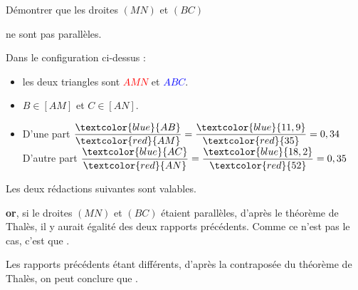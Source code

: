 \begin{methode*1}
\begin{minipage}{8cm}
                Démontrer que les droites $(MN)$ et $(BC)$ 
                
                ne sont pas parallèles.
            \end{minipage}
            
            \correction
            Dans le configuration ci-dessus : 
            \begin{itemize}
                \item les deux triangles sont \textcolor{red}{$AMN$} et \textcolor{blue}{$ABC$}.
                \item $B \in [AM]$ et $C \in [AN]$.
                \item D'une part $\dfrac{\textcolor{blue}{AB}}{\textcolor{red}{AM}} = \dfrac{\textcolor{blue}{11,9}}{\textcolor{red}{35}}=0,34$
                \hfill
                D'autre part $\dfrac{\textcolor{blue}{AC}}{\textcolor{red}{AN}} = \dfrac{\textcolor{blue}{18,2}}{\textcolor{red}{52}}=0,35$
            \end{itemize}

            \begin{remarque}
                Les deux rédactions suivantes sont valables.
            \end{remarque}
            
            \hspace*{0.5cm}

            \begin{minipage}{8cm}
                \textbf{or}, si le droites $(MN)$ et $(BC)$ étaient parallèles, d'après le théorème de Thalès, il y aurait égalité des deux rapports
                précédents. Comme ce n'est pas le cas, c'est que .
    
            \end{minipage}
            \hspace*{0.5cm}
            \vrule
            \hspace*{0.5cm}
            \begin{minipage}{8cm}
                Les rapports précédents étant différents, d'après la contraposée du théorème de Thalès, on peut conclure que .
            \end{minipage}
        \end{methode*1}



